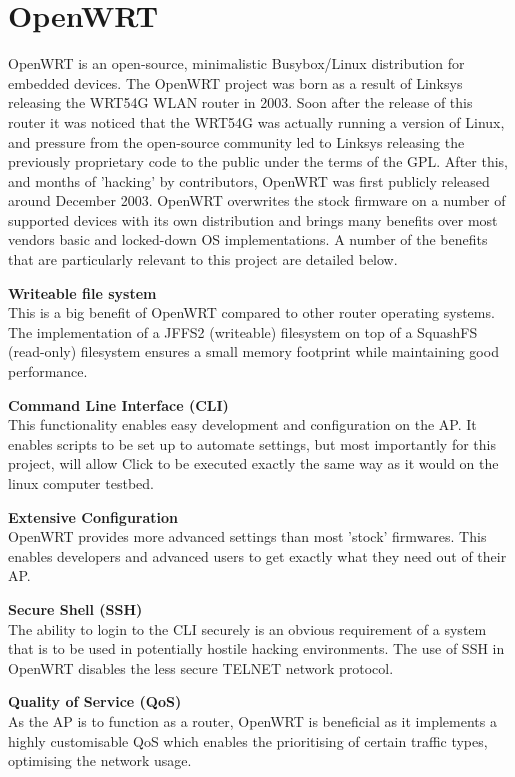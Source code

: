   \section{OpenWRT}
    \label{sec:openwrt}
    OpenWRT is an open-source, minimalistic Busybox/Linux distribution for embedded devices. The OpenWRT project was born as a result of Linksys releasing the WRT54G WLAN router in 2003. Soon after the release of this router it was noticed that the WRT54G was actually running a version of Linux, and pressure from the open-source community led to Linksys releasing the previously proprietary code to the public under the terms of the GPL. After this, and months of 'hacking' by contributors, OpenWRT was first publicly released around December 2003.\cite{entry-0b} OpenWRT overwrites the stock firmware on a number of supported devices with its own distribution and brings many benefits over most vendors basic and locked-down OS implementations. A number of the benefits that are particularly relevant to this project are detailed below.

    \begin{itemize*}
    \item\textbf{Writeable file system}\hfill\\This is a big benefit of OpenWRT compared to other router operating systems. The implementation of a JFFS2 (writeable) filesystem on top of a SquashFS (read-only) filesystem ensures a small memory footprint while maintaining good performance.
    \item\textbf{Command Line Interface (CLI)}\hfill\\This functionality enables easy development and configuration on the AP. It enables scripts to be set up to automate settings, but most importantly for this project, will allow Click to be executed exactly the same way as it would on the linux computer testbed.
    \item\textbf{Extensive Configuration}\hfill\\OpenWRT provides more advanced settings than most 'stock' firmwares. This enables developers and advanced users to get exactly what they need out of their AP.
    \item\textbf{Secure Shell (SSH)}\hfill\\The ability to login to the CLI securely is an obvious requirement of a system that is to be used in potentially hostile hacking environments. The use of SSH in OpenWRT disables the less secure TELNET network protocol.
    \item\textbf{Quality of Service (QoS)}\hfill\\As the AP is to function as a router, OpenWRT is beneficial as it implements a highly customisable QoS which enables the prioritising of certain traffic types, optimising the network usage.
    \end{itemize*}

